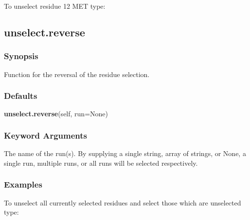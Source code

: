 

 To unselect residue 12 MET type: 
  






  

 \newpage 

 \subsection{unselect.reverse} 

  
 \subsubsection{Synopsis} 

 Function for the reversal of the residue selection. 
  

  
 \subsubsection{Defaults} 

 \textsf{\textbf{unselect.reverse}(self, run=None)} 

  
 \subsubsection{Keyword Arguments} 

   The name of the run(s).  By supplying a single string, array of strings, or None, a single run, multiple runs, or all runs will be selected respectively.  

  

  
 \subsubsection{Examples} 

 To unselect all currently selected residues and select those which are unselected type: 
  

